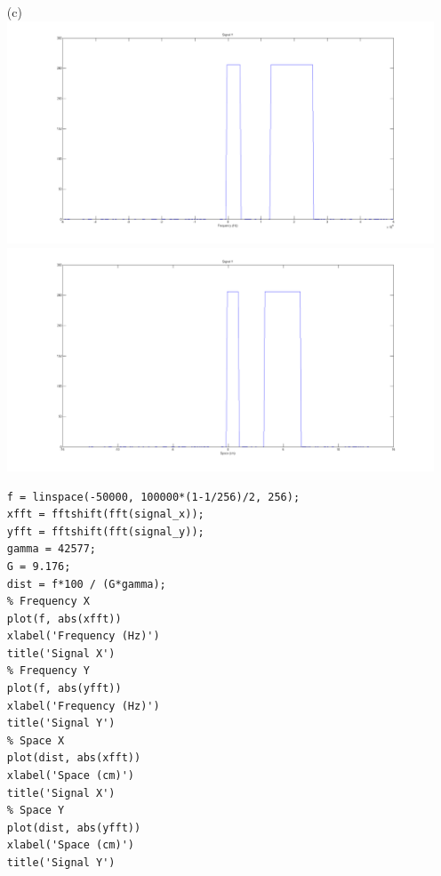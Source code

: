 \documentclass{article}
\begin{document}
\begin{enumerate}
\begin{enumerate}
	\item[(c)] $\;$\\
\includegraphics[width=\textwidth]{../images/SignalY} \\
\includegraphics[width=\textwidth]{../images/SpaceY} \\

\newpage 

\begin{lstlisting}   
f = linspace(-50000, 100000*(1-1/256)/2, 256);
xfft = fftshift(fft(signal_x));
yfft = fftshift(fft(signal_y));
gamma = 42577;
G = 9.176;
dist = f*100 / (G*gamma);
% Frequency X
plot(f, abs(xfft))
xlabel('Frequency (Hz)')
title('Signal X')
% Frequency Y
plot(f, abs(yfft))
xlabel('Frequency (Hz)')
title('Signal Y')
% Space X
plot(dist, abs(xfft))
xlabel('Space (cm)')
title('Signal X')
% Space Y
plot(dist, abs(yfft))
xlabel('Space (cm)')
title('Signal Y')
\end{lstlisting}
	\end{enumerate}
\end{enumerate}
\end{document}
